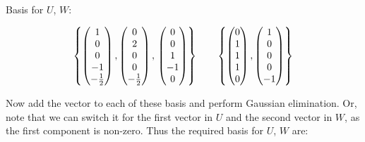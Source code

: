 \documentclass[a4paper]{article}
\begin{document}
	Basis for $ U $, $ W $:
	
	\[ \left\{  
	\begin{pmatrix}
	1\\
	0\\
	0\\
	-1\\
	-\frac{1}{2}
	\end{pmatrix}, 
	\begin{pmatrix}
	0\\
	2\\
	0\\
	0\\
	-\frac{1}{2}
	\end{pmatrix},\\
	\begin{pmatrix}
	0\\
	0\\
	1\\
	-1\\
	0
	\end{pmatrix}\right\} \qquad 	
	 \left\{  \begin{pmatrix}
	0 \\
	1 \\
	1 \\
	1 \\
	0
	\end{pmatrix}, \begin{pmatrix}
	1 \\
	0 \\
	0 \\
	0 \\
	-1
	\end{pmatrix}\right\} \]
	
	
	Now add the vector to each of these basis and perform Gaussian elimination. Or, note that we can switch it for the first vector in $ U $ and the second vector in $ W $, as the first component is non-zero. Thus
	the required basis for $ U $, $ W $ are:
	
\end{document}

